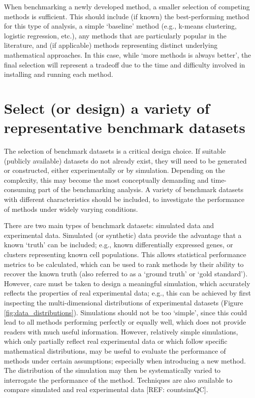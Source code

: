 \documentclass[12pt, a4paper]{article}
\begin{document}
When benchmarking a newly developed method, a smaller selection of competing methods is sufficient. This should include (if known) the best-performing method for this type of analysis, a simple `baseline' method (e.g., k-means clustering, logistic regression, etc.), any methods that are particularly popular in the literature, and (if applicable) methods representing distinct underlying mathematical approaches. In this case, while `more methods is always better', the final selection will represent a tradeoff due to the time and difficulty involved in installing and running each method.




\section{Select (or design) a variety of representative benchmark datasets}

The selection of benchmark datasets is a critical design choice. If suitable (publicly available) datasets do not already exist, they will need to be generated or constructed, either experimentally or by simulation. Depending on the complexity, this may become the most conceptually demanding and time-consuming part of the benchmarking analysis. A variety of benchmark datasets with different characteristics should be included, to investigate the performance of methods under widely varying conditions.

There are two main types of benchmark datasets: simulated data and experimental data. Simulated (or synthetic) data provide the advantage that a known `truth' can be included; e.g., known differentially expressed genes, or clusters representing known cell populations. This allows statistical performance metrics to be calculated, which can be used to rank methods by their ability to recover the known truth (also referred to as a `ground truth' or `gold standard'). However, care must be taken to design a meaningful simulation, which accurately reflects the properties of real experimental data; e.g., this can be achieved by first inspecting the multi-dimensional distributions of experimental datasets (Figure \ref{fig:data_distributions}). Simulations should not be too `simple', since this could lead to all methods performing perfectly or equally well, which does not provide readers with much useful information. However, relatively simple simulations, which only partially reflect real experimental data or which follow specific mathematical distributions, may be useful to evaluate the performance of methods under certain assumptions; especially when introducing a new method. The distribution of the simulation may then be systematically varied to interrogate the performance of the method. Techniques are also available to compare simulated and real experimental data [REF: countsimQC].
\end{document}
